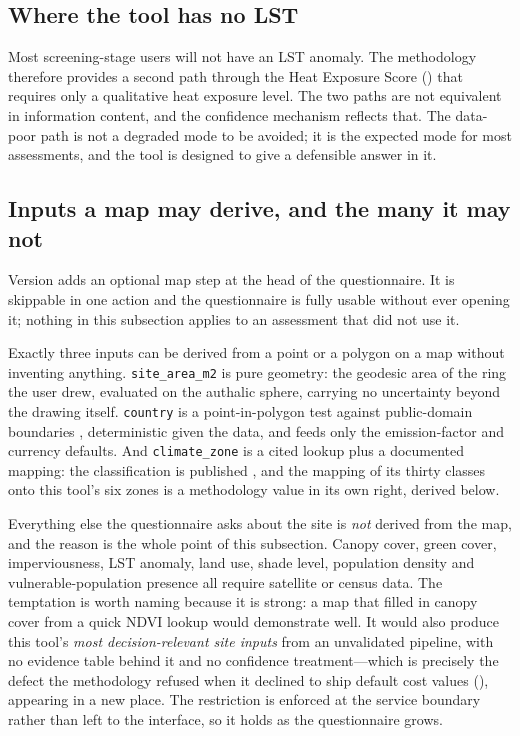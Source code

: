 \subsection{Where the tool has no LST}

Most screening-stage users will not have an LST anomaly. The methodology
therefore provides a second path through the Heat Exposure Score
() that requires only a qualitative heat exposure level.
The two paths are not equivalent in information content, and the confidence
mechanism reflects that. The data-poor path is not a degraded mode to be
avoided; it is the expected mode for most assessments, and the tool is designed
to give a defensible answer in it.

\subsection{Inputs a map may derive, and the many it may not}
\label{sec:map-derived-inputs}

Version \methver{} adds an optional map step at the head of the questionnaire.
It is skippable in one action and the questionnaire is fully usable without
ever opening it; nothing in this subsection applies to an assessment that did
not use it.

Exactly three inputs can be derived from a point or a polygon on a map without
inventing anything. \texttt{site\_area\_m2} is pure geometry: the geodesic area
of the ring the user drew, evaluated on the authalic sphere, carrying no
uncertainty beyond the drawing itself. \texttt{country} is a point-in-polygon
test against public-domain boundaries \parencite{naturalearth}, deterministic given
the data, and feeds only the emission-factor and currency defaults. And
\texttt{climate\_zone} is a cited lookup plus a documented mapping: the
classification is published \parencite{beck2023}, and the mapping of its thirty
classes onto this tool's six zones is a methodology value in its own right,
derived below.

Everything else the questionnaire asks about the site is \emph{not} derived
from the map, and the reason is the whole point of this subsection. Canopy
cover, green cover, imperviousness, LST anomaly, land use, shade level,
population density and vulnerable-population presence all require satellite or
census data. The temptation is worth naming because it is strong: a map that
filled in canopy cover from a quick NDVI lookup would demonstrate well. It
would also produce this tool's \emph{most decision-relevant site inputs} from
an unvalidated pipeline, with no evidence table behind it and no confidence
treatment---which is precisely the defect the methodology refused when it
declined to ship default cost values (), appearing
in a new place. The restriction is enforced at the service boundary rather than
left to the interface, so it holds as the questionnaire grows.

